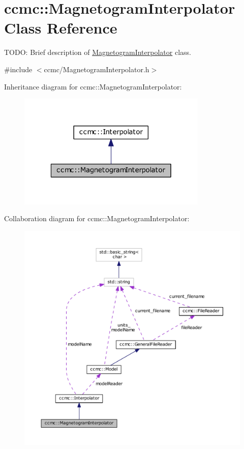 \hypertarget{classccmc_1_1_magnetogram_interpolator}{\section{ccmc\-:\-:Magnetogram\-Interpolator Class Reference}
\label{classccmc_1_1_magnetogram_interpolator}
}


T\-O\-D\-O\-: Brief description of \hyperlink{classccmc_1_1_magnetogram_interpolator}{Magnetogram\-Interpolator} class.  




{\ttfamily \#include $<$ccmc/\-Magnetogram\-Interpolator.\-h$>$}



Inheritance diagram for ccmc\-:\-:Magnetogram\-Interpolator\-:\nopagebreak
\begin{figure}[H]
\begin{center}
\leavevmode
\includegraphics[width=256pt]{classccmc_1_1_magnetogram_interpolator__inherit__graph}
\end{center}
\end{figure}


Collaboration diagram for ccmc\-:\-:Magnetogram\-Interpolator\-:\nopagebreak
\begin{figure}[H]
\begin{center}
\leavevmode
\includegraphics[width=350pt]{classccmc_1_1_magnetogram_interpolator__coll__graph}
\end{center}
\end{figure}
